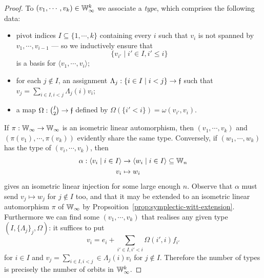 \begin{proof}
    To $(v_1, \cdots, v_k) \in \mathbb{W}_\infty^k$ we associate a \emph{type}, 
    which comprises the following data:
    \begin{itemize}
        \item 
        pivot indices $I \subseteq \{1, \cdots, k\}$ containing every $i$ 
        such that $v_i$ is not spanned by $v_1, \cdots, v_{i-1}$
        --- so we inductively ensure that $$\{v_{i'} \mid i' \in I, i' \leq i\}$$ is a basis for $\langle v_1, \cdots, v_i \rangle$;

        \item 
        for each $j \not\in I$, an assignment $\Lambda_j : \{i \in I \mid i < j\} \to \mathfrak{f}$
        such that $v_j = \sum_{i \in I, i < j} \Lambda_j(i) v_i$;

        \item 
        a map $\Omega : \binom{I}{2} \to \mathfrak{f}$ defined by $\Omega(\{i' < i\}) = \omega(v_{i'}, v_{i})$.
    \end{itemize}
    If $\pi : \mathbb{W}_\infty \to \mathbb{W}_\infty$ is an isometric linear automorphism,
    then $(v_1, \cdots, v_k)$ and $(\pi(v_1), \cdots, \pi(v_k))$ evidently share the same type.
    Conversely, if $(w_1, \cdots, w_k)$ has the type of $(v_i, \cdots, v_k)$,
    then
    \begin{align*}
        \alpha : \langle v_i \mid i \in I \rangle 
        &\to \langle w_i \mid i \in I \rangle 
        \subseteq \mathbb{W}_n \\
        v_i &\mapsto w_i
    \end{align*}
    gives an isometric linear injection for some large enough $n$.
    Observe that $\alpha$ must send $v_j \mapsto w_j$ for $j \not\in I$ too,
    and that it may be extended to an isometric linear automorphism $\pi$ of $\mathbb{W}_\infty$ by Propsoition~\ref{prop:symplectic-witt-extension}.
    Furthermore we can find some $(v_1, \cdots, v_k)$ that realises any given type $(I, \{\Lambda_j\}_j, \Omega)$:
    it suffices to put
    \[
        v_i = e_i + \sum_{i' \in I, i' < i} \Omega(i', i) f_{i'}
    \]
    for $i \in I$ and $v_j = \sum_{i \in I, i < j} \in \Lambda_j(i) v_i$ for $j \not\in I$.
    Therefore the number of types is precisely the number of orbits in $\mathbb{W}_\infty^k$.


\end{proof}
